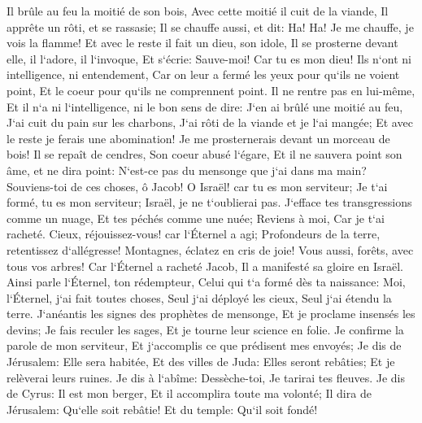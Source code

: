 \verse Il brûle au feu la moitié de son bois, Avec cette moitié il cuit de la viande, Il apprête un rôti, et se rassasie; Il se chauffe aussi, et dit: Ha! Ha! Je me chauffe, je vois la flamme! 
\verse Et avec le reste il fait un dieu, son idole, Il se prosterne devant elle, il l`adore, il l`invoque, Et s`écrie: Sauve-moi! Car tu es mon dieu! 
\verse Ils n`ont ni intelligence, ni entendement, Car on leur a fermé les yeux pour qu`ils ne voient point, Et le coeur pour qu`ils ne comprennent point. 
\verse Il ne rentre pas en lui-même, Et il n`a ni l`intelligence, ni le bon sens de dire: J`en ai brûlé une moitié au feu, J`ai cuit du pain sur les charbons, J`ai rôti de la viande et je l`ai mangée; Et avec le reste je ferais une abomination! Je me prosternerais devant un morceau de bois! 
\verse Il se repaît de cendres, Son coeur abusé l`égare, Et il ne sauvera point son âme, et ne dira point: N`est-ce pas du mensonge que j`ai dans ma main? 
\verse Souviens-toi de ces choses, ô Jacob! O Israël! car tu es mon serviteur; Je t`ai formé, tu es mon serviteur; Israël, je ne t`oublierai pas. 
\verse J`efface tes transgressions comme un nuage, Et tes péchés comme une nuée; Reviens à moi, Car je t`ai racheté. 
\verse Cieux, réjouissez-vous! car l`Éternel a agi; Profondeurs de la terre, retentissez d`allégresse! Montagnes, éclatez en cris de joie! Vous aussi, forêts, avec tous vos arbres! Car l`Éternel a racheté Jacob, Il a manifesté sa gloire en Israël. 
\verse Ainsi parle l`Éternel, ton rédempteur, Celui qui t`a formé dès ta naissance: Moi, l`Éternel, j`ai fait toutes choses, Seul j`ai déployé les cieux, Seul j`ai étendu la terre. 
\verse J`anéantis les signes des prophètes de mensonge, Et je proclame insensés les devins; Je fais reculer les sages, Et je tourne leur science en folie. 
\verse Je confirme la parole de mon serviteur, Et j`accomplis ce que prédisent mes envoyés; Je dis de Jérusalem: Elle sera habitée, Et des villes de Juda: Elles seront rebâties; Et je relèverai leurs ruines. 
\verse Je dis à l`abîme: Dessèche-toi, Je tarirai tes fleuves. 
\verse Je dis de Cyrus: Il est mon berger, Et il accomplira toute ma volonté; Il dira de Jérusalem: Qu`elle soit rebâtie! Et du temple: Qu`il soit fondé! 

